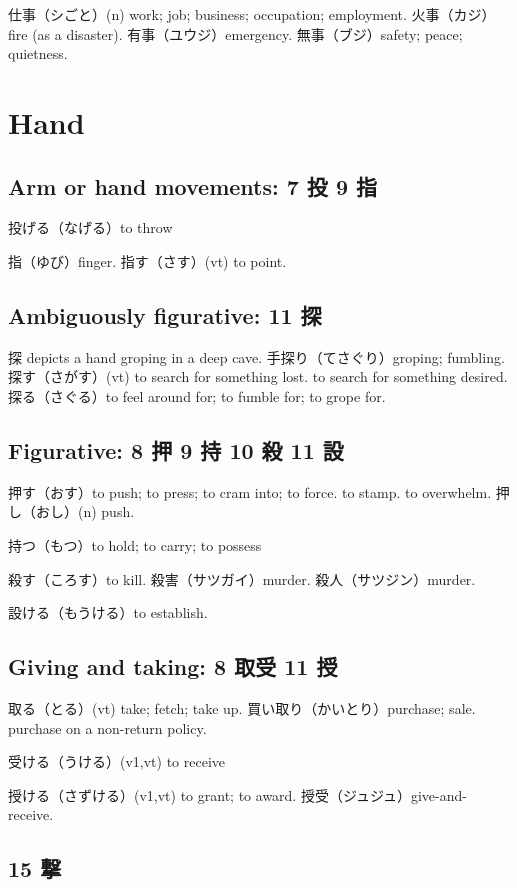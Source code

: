仕事（シごと）(n) work; job; business; occupation; employment.
火事（カジ）fire (as a disaster).
有事（ユウジ）emergency.
無事（ブジ）safety; peace; quietness.

\section{Hand}

\subsection{Arm or hand movements: 7 投 9 指}

投げる（なげる）to throw

指（ゆび）finger.
指す（さす）(vt) to point.

\subsection{Ambiguously figurative: 11 探}

探 depicts a hand groping in a deep cave.
手探り（てさぐり）groping; fumbling.
探す（さがす）(vt)
to search for something lost.
to search for something desired.
探る（さぐる）to feel around for; to fumble for; to grope for.

\subsection{Figurative: 8 押 9 持 10 殺 11 設}

押す（おす）to push; to press; to cram into; to force.
to stamp.
to overwhelm.
押し（おし）(n) push.

持つ（もつ）to hold; to carry; to possess

殺す（ころす）to kill.
殺害（サツガイ）murder.
殺人（サツジン）murder.

設ける（もうける）to establish.

\subsection{Giving and taking: 8 取受 11 授}

取る（とる）(vt) take; fetch; take up.
買い取り（かいとり）purchase; sale. purchase on a non-return policy.

受ける（うける）(v1,vt) to receive

授ける（さずける）(v1,vt) to grant; to award.
授受（ジュジュ）give-and-receive.

\subsection{15 撃}

